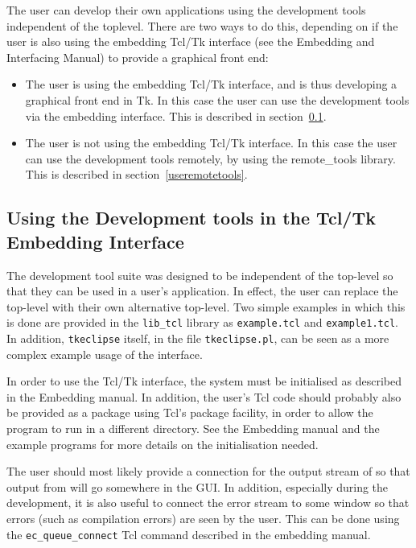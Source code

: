 The user can develop their own {\eclipse} applications using the
development tools independent of the {\tkeclipse} toplevel. There are two
ways to do this, depending on if the user is also using the embedding Tcl/Tk
interface (see the Embedding and Interfacing Manual) to provide a graphical
front end:

\begin{itemize}
\item The user is using the embedding Tcl/Tk interface, and is thus
developing a graphical front end in Tk. In this case the user can use the
 development tools via the embedding interface. This is described in
 section~\ref{embedtools}. 
\item The user is not using the embedding Tcl/Tk interface. In this case
 the user can use the development tools remotely, by using the remote_tools
 library. This is described in section~\ref{useremotetools}.
\end{itemize}

\subsection{Using the Development tools in the Tcl/Tk Embedding Interface}
\label{embedtools}

 The development tool suite was
designed to be independent of the {\tkeclipse} top-level so that they can be
used in a user's application. In effect, the user can replace the
{\tkeclipse}
top-level with their own alternative top-level. Two simple examples in
which this is done are provided in the \verb'lib_tcl' library as
\verb'example.tcl' and \verb'example1.tcl'. In addition, \verb'tkeclipse'
itself, in the file \verb'tkeclipse.pl', can be seen as a more complex
example usage of the interface.

In order to use the Tcl/Tk interface, the system must be initialised as
described in the Embedding manual. In addition, the user's Tcl code should
probably also be provided as a package using Tcl's package facility, in
order to allow the program to run in a different directory. See the
Embedding manual and the example programs for more details on the
initialisation needed. 

The user should most likely provide a connection for the output stream
of {\eclipse} so that output from {\eclipse} will go somewhere in the GUI. In
addition, especially during the development, it is also useful to connect
the error stream to some window so that errors (such as {\eclipse}
compilation errors) are seen by the user. This can be done using the
\verb'ec_queue_connect' Tcl command described in the embedding manual.

